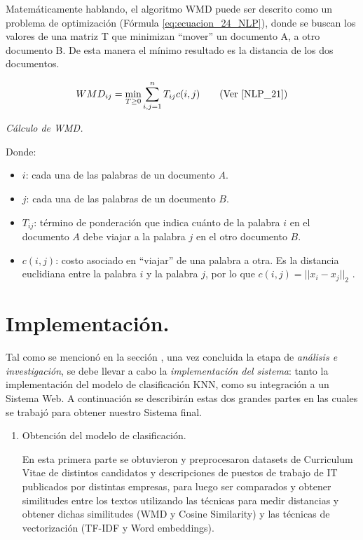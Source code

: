 \documentclass[12pt,a4paper]{article}
\begin{document}
\begin{sloppypar}
Matemáticamente hablando, el algoritmo WMD puede ser descrito como un problema de optimización (Fórmula \ref{eq:ecuacion_24_NLP}), donde se buscan los valores de una matriz T que minimizan “mover” un documento A, a otro documento B. De esta manera el mínimo resultado es la distancia de los dos documentos. 

\begin{equation}\label{eq:ecuacion_24_NLP}
WMD_{ij} = \min_{T\geq0} \sum_{i,j = 1}^{n} T_{ij} c(i,j)      \qquad \text{(Ver \cite{NLP_21})}
\end{equation}
\begin{center}
\textit{Cálculo de WMD.}
\end{center}

Donde:
\begin{itemize}
\item $i$: cada una de las palabras de un documento $A$.
\item $j$: cada una de las palabras de un documento $B$.
\item $T_{ij}$: término de ponderación que indica cuánto de la palabra $i$ en el documento $A$ debe viajar a la palabra $j$ en el otro documento $B$.
\item $c(i,j)$: costo asociado en “viajar” de una palabra a otra. Es la distancia euclidiana entre la palabra $i$ y la palabra $j$, por lo que $c(i,j) = ||x_{i} - x_{j}||_{2}$ \cite{wmd_paper}.

\end{itemize}

\cleardoublepage

\section{Implementación.}\label{5.Implementacion}

Tal como se mencionó en la sección \textit{}, una vez concluida la etapa de \textit{análisis e investigación}, se debe llevar a cabo la \textit{implementación del sistema}: tanto la implementación del modelo de clasificación KNN, como su integración a un Sistema Web. A continuación se describirán estas dos grandes partes en las cuales se trabajó para obtener nuestro Sistema final. 

\begin{enumerate}
\item Obtención del modelo de clasificación. 

En esta primera parte se obtuvieron y preprocesaron datasets de Curriculum Vitae de distintos candidatos y descripciones de puestos de trabajo de IT publicados por distintas empresas, para luego ser comparados y obtener similitudes entre los textos utilizando las técnicas para medir distancias y obtener dichas similitudes (WMD y Cosine Similarity) y las técnicas de vectorización (TF-IDF y Word embeddings).


\end{enumerate}
\end{sloppypar}
\end{document}
